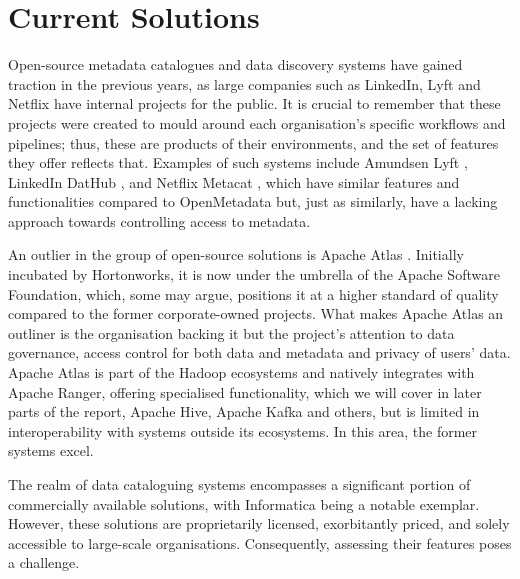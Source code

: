 \section{Current Solutions}

Open-source metadata catalogues and data discovery systems have gained traction in the previous years, as large companies such as LinkedIn, Lyft and Netflix have internal projects for the public. It is crucial to remember that these projects were created to mould around each organisation's specific workflows and pipelines; thus, these are products of their environments, and the set of features they offer reflects that. Examples of such systems include Amundsen Lyft \cite{amundsenLyftGrover2019}, LinkedIn DatHub \cite{dataHubLinkedinLan2019}, and Netflix Metacat \cite{metacatNetflixMajumdar2018}, which have similar features and functionalities compared to OpenMetadata but, just as similarly, have a lacking approach towards controlling access to metadata.

An outlier in the group of open-source solutions is Apache Atlas \cite{apacheAtlasTech}. Initially incubated by Hortonworks, it is now under the umbrella of the Apache Software Foundation, which, some may argue, positions it at a higher standard of quality compared to the former corporate-owned projects. What makes Apache Atlas an outliner is the organisation backing it but the project's attention to data governance, access control for both data and metadata and privacy of users' data. Apache Atlas is part of the Hadoop ecosystems and natively integrates with Apache Ranger, offering specialised functionality, which we will cover in later parts of the report, Apache Hive, Apache Kafka and others, but is limited in interoperability with systems outside its ecosystems. In this area, the former systems excel.

The realm of data cataloguing systems encompasses a significant portion of commercially available solutions, with Informatica \cite{informaticaTech} being a notable exemplar. However, these solutions are proprietarily licensed, exorbitantly priced, and solely accessible to large-scale organisations. Consequently, assessing their features poses a challenge.
